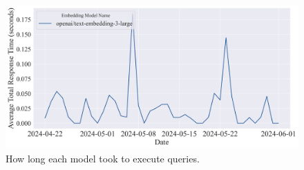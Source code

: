 \begin{figure}[H]
    \centering
    \includegraphics[width=1\textwidth]{results/plots/assets/performance-07-embedding-function-query-performance.png}
    \caption{How long each model took to execute queries.}
    \label{fig:performance_07_embedding_function_query_performance}
\end{figure}